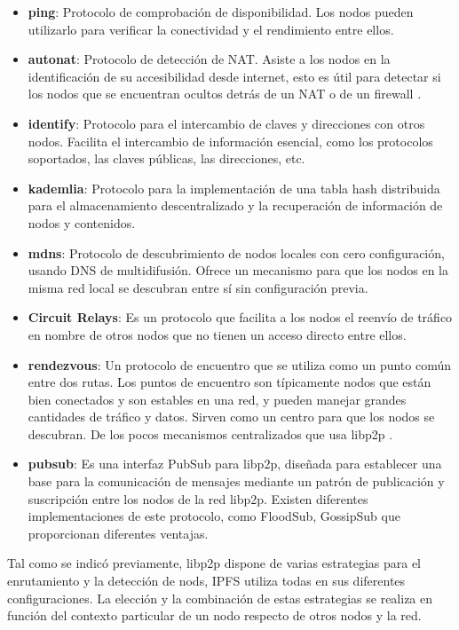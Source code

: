 \begin{itemize}[itemsep=1pt,nolistsep]
      \item \textbf{ping}: Protocolo de comprobación de disponibilidad. Los nodos pueden utilizarlo para verificar la conectividad y el rendimiento entre ellos.
      \item \textbf{autonat}: Protocolo de detección de NAT. Asiste a los nodos en la identificación de su accesibilidad desde internet, esto es útil para detectar si los nodos que se encuentran ocultos detrás de un NAT o de un firewall \cite{AutoNAT}.
      \item \textbf{identify}: Protocolo para el intercambio de claves y direcciones con otros nodos. Facilita el intercambio de información esencial, como los protocolos soportados, las claves públicas, las direcciones, etc.
      \item \textbf{kademlia}: Protocolo para la implementación de una tabla hash distribuida para el almacenamiento descentralizado y la recuperación de información de nodos y contenidos\cite{Kademlia2023}.
      \item \textbf{mdns}: Protocolo de descubrimiento de nodos locales con cero configuración, usando DNS de multidifusión. Ofrece un mecanismo para que los nodos en la misma red local se descubran entre sí sin configuración previa.
      \item \textbf{Circuit Relays}: Es un protocolo que facilita a los nodos el reenvío de tráfico en nombre de otros nodos que no tienen un acceso directo entre ellos\cite{CircuitRelay}.
      \item \textbf{rendezvous}: Un protocolo de encuentro que se utiliza como un punto común entre dos rutas.
            Los puntos de encuentro son típicamente nodos que están bien conectados y son estables en una red, y pueden manejar grandes cantidades de tráfico y datos. Sirven como un centro para que los nodos se descubran. De los pocos mecanismos centralizados que usa libp2p \cite{Rendezvous}.
      \item \textbf{pubsub}: Es una interfaz PubSub para libp2p, diseñada para establecer una base para la comunicación de mensajes mediante un patrón de publicación y suscripción entre los nodos de la red libp2p. Existen diferentes implementaciones de este protocolo, como FloodSub, GossipSub que proporcionan
            diferentes ventajas.
\end{itemize}

Tal como se indicó previamente, libp2p dispone de varias estrategias para el enrutamiento y la detección de nods, IPFS utiliza todas en sus diferentes configuraciones. La elección y la combinación de estas estrategias se realiza en función del contexto particular de un nodo respecto de otros nodos y la red.

